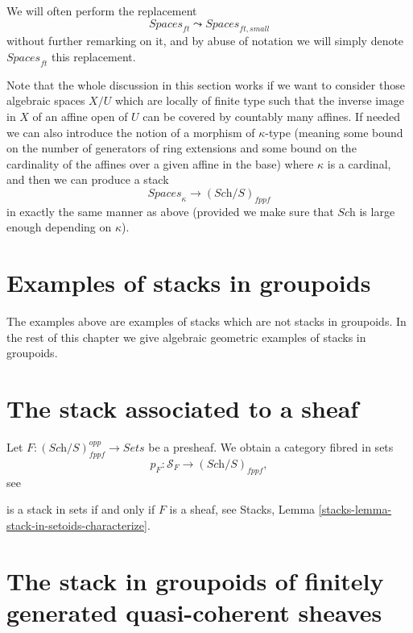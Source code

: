 \noindent
We will often perform the replacement
$$
\textit{Spaces}_{ft} \leadsto \textit{Spaces}_{ft, small}
$$
without further remarking on it, and by abuse of notation we will
simply denote $\textit{Spaces}_{ft}$ this replacement.

\begin{remark}
\label{remark-higher-cardinality-spaces}
Note that the whole discussion in this section works
if we want to consider those algebraic spaces $X/U$ which are
locally of finite type such that the inverse image in $X$ of an affine open
of $U$ can be covered by countably many affines.
If needed we can also introduce the notion of a morphism of
$\kappa$-type (meaning some bound on the number of generators of
ring extensions and some bound on the cardinality of the affines over
a given affine in the base) where $\kappa$ is a cardinal, and then
we can produce a stack
$$
\textit{Spaces}_\kappa \longrightarrow (\textit{Sch}/S)_{fppf}
$$
in exactly the same manner as above (provided we make sure that
$\textit{Sch}$ is large enough depending on $\kappa$).
\end{remark}





\section{Examples of stacks in groupoids}
\label{section-examples-stacks-in-groupoids}

\noindent
The examples above are examples of stacks which are not stacks in
groupoids. In the rest of this chapter we give
algebraic geometric examples of stacks in groupoids.



\section{The stack associated to a sheaf}
\label{section-stack-associated-to-sheaf}

\noindent
Let $F : (\textit{Sch}/S)_{fppf}^{opp} \to \textit{Sets}$ be a presheaf.
We obtain a category fibred in sets
$$
p_F : \mathcal{S}_F \to (\textit{Sch}/S)_{fppf},
$$
see 

is a stack in sets if and only if $F$ is a sheaf, see
Stacks, Lemma \ref{stacks-lemma-stack-in-setoids-characterize}.



\section{The stack in groupoids of finitely generated quasi-coherent sheaves}
\label{section-stack-in-groupoids-of-quasi-coherent-sheaves}


